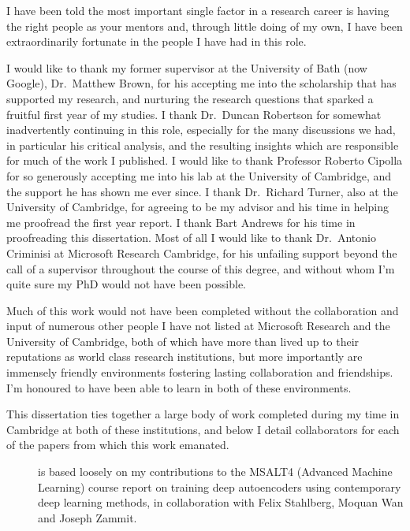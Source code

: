 
\begin{acknowledgements}      
I have been told the most important single factor in a research career is having the right people as your mentors and, through little doing of my own, I have been extraordinarily fortunate in the people I have had in this role. 

I would like to thank my former supervisor at the University of Bath (now Google), Dr.~Matthew Brown, for his accepting me into the scholarship that has supported my research, and nurturing the research questions that sparked a fruitful first year of my studies. I thank Dr.~Duncan Robertson for somewhat inadvertently continuing in this role, especially for the many discussions we had, in particular his critical analysis, and the resulting insights which are responsible for much of the work I published. I would like to thank Professor Roberto Cipolla for so generously accepting me into his lab at the University of Cambridge, and the support he has shown me ever since. I thank Dr.~Richard Turner, also at the University of Cambridge, for agreeing to be my advisor and his time in helping me proofread the first year report. I thank Bart Andrews
for his time in proofreading this dissertation. Most of all I would like to thank Dr.~Antonio Criminisi at Microsoft Research Cambridge, for his unfailing support beyond the call of a supervisor throughout the course of this degree, and without whom I'm quite sure my PhD would not have been possible.

Much of this work would not have been completed without the collaboration and input of numerous other people I have not listed at Microsoft Research and the University of Cambridge, both of which have more than lived up to their reputations as world class research institutions, but more importantly are immensely friendly environments fostering lasting collaboration and friendships. I'm honoured to have been able to learn in both of these environments.
\pagebreak

This dissertation ties together a large body of work completed during my time in Cambridge at both of these institutions, and below I detail collaborators for each of the papers from which this work emanated.

\begin{description}
	\item[] is based loosely on my contributions to the MSALT4 (Advanced Machine Learning) course report on training deep autoencoders using contemporary deep learning methods, in collaboration with Felix Stahlberg, Moquan Wan and Joseph Zammit.


\end{description}
\end{acknowledgements}
